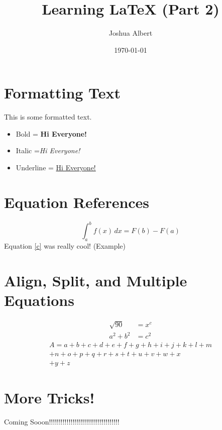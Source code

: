 \documentclass{article}
\title{Learning LaTeX (Part 2)}
\author{Joshua Albert}
\date{\today}
\begin{document}
\maketitle

\section{Formatting Text}
This is some formatted text.
\begin{itemize}
\item Bold = \textbf{Hi Everyone!}
\item Italic =\textit{Hi Everyone!}
\item Underline = \underline{Hi Everyone!}
\end{itemize}

\section{Equation References}
\begin{equation}
    \int_{a}^{b} f(x) \, dx = F(b) - F(a)
    \label{c}
\end{equation}
Equation \ref{c} was really cool! (Example)

\section{Align, Split, and Multiple Equations}
\begin{align}
    \sqrt{90} &= x^{c} \\
    a^2 + b^2 &= c^2
\end{align}
\begin{multline}
    A = a + b + c + d + e + f + g + h + i + j + k + l + m \\
    + n + o + p + q + r + s + t + u + v + w + x \\
    + y + z \label{eq:long_equation}
\end{multline}

\section{More Tricks!}
\begin{center}
Coming Sooon!!!!!!!!!!!!!!!!!!!!!!!!!!!!!!!!!!!!
\end{center}
\end{document}
